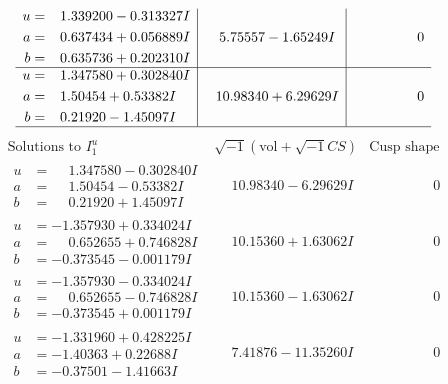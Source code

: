 \documentclass[1p]{elsarticle_modified}
\theoremstyle{definition}
\newcommand{\I}{\sqrt{-1}}
\begin{document}
$$\begin{array}{c|c|c}
\begin{aligned}
u &= \phantom{-}1.339200 - 0.313327 I \\
a &= \phantom{-}0.637434 + 0.056889 I \\
b &= \phantom{-}0.635736 + 0.202310 I\end{aligned}
 & \phantom{-}5.75557 - 1.65249 I & \phantom{-0.000000 } 0 \\ \hline\begin{aligned}
u &= \phantom{-}1.347580 + 0.302840 I \\
a &= \phantom{-}1.50454 + 0.53382 I \\
b &= \phantom{-}0.21920 - 1.45097 I\end{aligned}
 & \phantom{-}10.98340 + 6.29629 I & \phantom{-0.000000 } 0\\
 \hline 
 \end{array}$$\newpage$$\begin{array}{c|c|c}  
\text{Solutions to }I^u_{1}& \I (\text{vol} + \sqrt{-1}CS) & \text{Cusp shape}\\
 \hline 
\begin{aligned}
u &= \phantom{-}1.347580 - 0.302840 I \\
a &= \phantom{-}1.50454 - 0.53382 I \\
b &= \phantom{-}0.21920 + 1.45097 I\end{aligned}
 & \phantom{-}10.98340 - 6.29629 I & \phantom{-0.000000 } 0 \\ \hline\begin{aligned}
u &= -1.357930 + 0.334024 I \\
a &= \phantom{-}0.652655 + 0.746828 I \\
b &= -0.373545 - 0.001179 I\end{aligned}
 & \phantom{-}10.15360 + 1.63062 I & \phantom{-0.000000 } 0 \\ \hline\begin{aligned}
u &= -1.357930 - 0.334024 I \\
a &= \phantom{-}0.652655 - 0.746828 I \\
b &= -0.373545 + 0.001179 I\end{aligned}
 & \phantom{-}10.15360 - 1.63062 I & \phantom{-0.000000 } 0 \\ \hline\begin{aligned}
u &= -1.331960 + 0.428225 I \\
a &= -1.40363 + 0.22688 I \\
b &= -0.37501 - 1.41663 I\end{aligned}
 & \phantom{-}7.41876 - 11.35260 I & \phantom{-0.000000 } 0 \\ \hline\begin{aligned}

\end{aligned}
\end{array}$$
\end{document}
